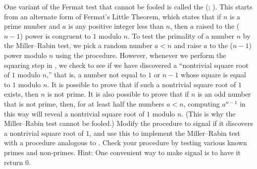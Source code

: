 \begin{exercise}
	\label{Exercise 1.28}
	One variant of the Fermat test that cannot be fooled is called the  (; ).
	This starts from an alternate form of Fermat’s Little Theorem, which states that if \( n \) is a prime number and \( a \) is any positive integer less than \( n \), then \( a \) raised to the (\( n - 1 \)) power is congruent to \( 1 \) modulo \( n \).
	To test the primality of a number \( n \) by the Miller--Rabin test, we pick a random number \( a < n \) and raise \( a \) to the (\( n - 1 \)) power modulo \( n \) using the  procedure.
	However, whenever we perform the squaring step in , we check to see if we have discovered a “nontrivial square root of \( 1 \) modulo \( n \),” that is, a number not equal to \( 1 \) or \( n - 1 \) whose square is equal to \( 1 \) modulo \( n \).
	It is possible to prove that if such a nontrivial square root of \( 1 \) exists, then \( n \) is not prime.
	It is also possible to prove that if \( n \) is an odd number that is not prime, then, for at least half the numbers \( a < n \), computing \( a^{n - 1} \) in this way will reveal a nontrivial square root of \( 1 \) modulo \( n \).
	(This is why the Miller--Rabin test cannot be fooled.)
	Modify the  procedure to signal if it discovers a nontrivial square root of \( 1 \), and use this to implement the Miller--Rabin test with a procedure analogous to .
	Check your procedure by testing various known primes and non-primes.
	Hint:
	One convenient way to make  signal is to have it return \( 0 \).
\end{exercise}
